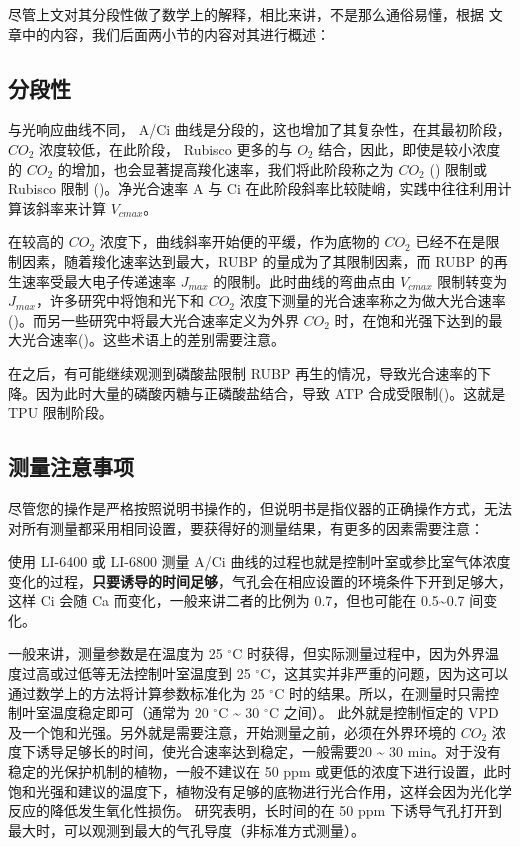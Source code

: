 \documentclass[
]{krantz}
\begin{document}
尽管上文对其分段性做了数学上的解释，相比来讲，不是那么通俗易懂，根据 \citet{matthew2018} 文章中的内容，我们后面两小节的内容对其进行概述：

\hypertarget{model_3}{%
\subsection{分段性}\label{model_3}}

与光响应曲线不同， A/Ci 曲线是分段的，这也增加了其复杂性，在其最初阶段，\(CO_2\) 浓度较低，在此阶段， Rubisco 更多的与 \(O_2\) 结合，因此，即使是较小浓度的 \(CO_2\) 的增加，也会显著提高羧化速率，我们将此阶段称之为 \(CO_2\) (\citet{Wullschleger1993Biochemical}) 限制或 Rubisco 限制 (\citet{Long2003Gas})。净光合速率 A 与 Ci 在此阶段斜率比较陡峭，实践中往往利用计算该斜率来计算 \(V_{cmax}\)。

在较高的 \(CO_2\) 浓度下，曲线斜率开始便的平缓，作为底物的 \(CO_2\) 已经不在是限制因素，随着羧化速率达到最大，RUBP 的量成为了其限制因素，而 RUBP 的再生速率受最大电子传递速率 \(J_{max}\) 的限制。此时曲线的弯曲点由 \(V_{cmax}\) 限制转变为 \(J_{max}\)，许多研究中将饱和光下和 \(CO_2\) 浓度下测量的光合速率称之为做大光合速率(\citet{heath2005rising})。而另一些研究中将最大光合速率定义为外界 \(CO_2\) 时，在饱和光强下达到的最大光合速率(\citet{marshall1980a})。这些术语上的差别需要注意。

在之后，有可能继续观测到磷酸盐限制 RUBP 再生的情况，导致光合速率的下降。因为此时大量的磷酸丙糖与正磷酸盐结合，导致 ATP 合成受限制(\citet{ellsworth2015phosphorus})。这就是 TPU 限制阶段。

\hypertarget{note_detail}{%
\subsection{测量注意事项}\label{note_detail}}

尽管您的操作是严格按照说明书操作的，但说明书是指仪器的正确操作方式，无法对所有测量都采用相同设置，要获得好的测量结果，有更多的因素需要注意：

使用 LI-6400 或 LI-6800 测量 A/Ci 曲线的过程也就是控制叶室或参比室气体浓度变化的过程，\textbf{只要诱导的时间足够}，气孔会在相应设置的环境条件下开到足够大，这样 Ci 会随 Ca 而变化，一般来讲二者的比例为 0.7，但也可能在 0.5\textasciitilde0.7 间变化。

一般来讲，测量参数是在温度为 25 \(^{\circ}\)C 时获得，但实际测量过程中，因为外界温度过高或过低等无法控制叶室温度到 25 \(^{\circ}\)C，这其实并非严重的问题，因为这可以通过数学上的方法将计算参数标准化为 25 \(^{\circ}\)C 时的结果。所以，在测量时只需控制叶室温度稳定即可（通常为 20 \(^{\circ}\)C \textasciitilde{} 30 \(^{\circ}\)C 之间）。 此外就是控制恒定的 VPD 及一个饱和光强。另外就是需要注意，开始测量之前，必须在外界环境的 \(CO_2\) 浓度下诱导足够长的时间，使光合速率达到稳定，一般需要20 \textasciitilde{} 30 min。对于没有稳定的光保护机制的植物，一般不建议在 50 ppm 或更低的浓度下进行设置，此时饱和光强和建议的温度下，植物没有足够的底物进行光合作用，这样会因为光化学反应的降低发生氧化性损伤。\citet{centritto2003} 研究表明，长时间的在 50 ppm 下诱导气孔打开到最大时，可以观测到最大的气孔导度（非标准方式测量）。
\end{document}
